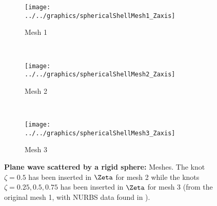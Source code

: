 \begin{figure}
	\centering
	\begin{subfigure}{0.23\textwidth}
		\centering
		\texttt{[image: ../../graphics/sphericalShellMesh1\_Zaxis]}
		\caption{Mesh 1}
    \end{subfigure}
    ~
	\begin{subfigure}{0.23\textwidth}
		\centering
		\texttt{[image: ../../graphics/sphericalShellMesh2\_Zaxis]}
		\caption{Mesh 2}
		\label{Fig2:SphericalShellMeshes2}
    \end{subfigure}
    ~
	\begin{subfigure}{0.23\textwidth}
		\centering
		\texttt{[image: ../../graphics/sphericalShellMesh3\_Zaxis]}
		\caption{Mesh 3}
		\label{Fig2:SphericalShellMeshes3}
    \end{subfigure}
	\caption{\textbf{Plane wave scattered by a rigid sphere:} Meshes. The knot $\zeta=0.5$ has been inserted in $\Zeta$ for mesh 2 while the knots $\zeta = 0.25, 0.5, 0.75$ has been inserted in $\Zeta$ for mesh 3 (from the original mesh 1, with NURBS data found in ).}
	\label{Fig2:SphericalShellMeshes}
\end{figure}


